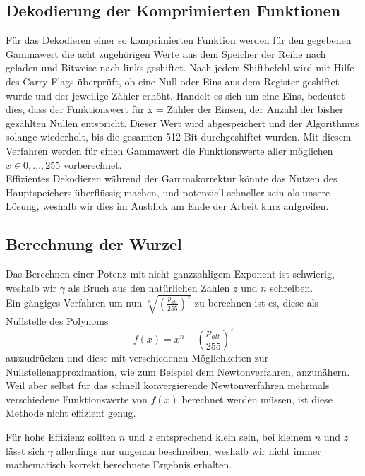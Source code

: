 \documentclass[course=erap]{aspdoc}
\begin{document}
	\subsection{Dekodierung der Komprimierten Funktionen}
	Für das Dekodieren einer so komprimierten Funktion werden für den gegebenen Gammawert die acht zugehörigen Werte aus dem Speicher der Reihe nach geladen und Bitweise nach links geshiftet. Nach jedem Shiftbefehl wird mit Hilfe des Carry-Flags überprüft, ob eine Null oder Eins aus dem Register geshiftet wurde und der jeweilige Zähler erhöht. Handelt es sich um eine Eins, bedeutet dies, dass der Funktionswert für x = Zähler der Einsen, der Anzahl der bisher gezählten Nullen entspricht. Dieser Wert wird abgespeichert und der Algorithmus solange wiederholt, bis die gesamten 512 Bit durchgeshiftet wurden. Mit diesem Verfahren werden für einen Gammawert die Funktionswerte aller möglichen $x\in{0,...,255}$ vorberechnet.\\
	Effizientes Dekodieren während der Gammakorrektur könnte das Nutzen des Hauptspeichers überflüssig machen, und potenziell schneller sein als unsere Lösung, weshalb wir dies im Ausblick am Ende der Arbeit kurz aufgreifen.

	\subsection{Berechnung der Wurzel}
	Das Berechnen einer Potenz mit nicht ganzzahligem Exponent ist schwierig, weshalb wir $\gamma$ als Bruch aus den natürlichen Zahlen $z$ und $n$ schreiben.\\
	
	\noindent Ein gängiges Verfahren um nun $\sqrt[n]{\left(\frac{p_{alt}}{255}\right)^{z}}$ zu berechnen ist es, diese als Nullstelle des Polynoms 
	\begin{equation}
	\label{(4)}
	f(x) = {x}^{n} - \left(\frac{p_{alt}}{255}\right)^{z}
	\end{equation}
	 auszudrücken und diese mit verschiedenen Möglichkeiten zur Nullstellenapproximation, wie zum Beispiel dem Newtonverfahren, anzunähern. Weil aber selbst für das schnell konvergierende Newtonverfahren mehrmals verschiedene Funktionswerte von $f(x)$ berechnet werden müssen, ist diese Methode nicht effizient genug.
	
	Für hohe Effizienz sollten $n$ und $z$ entsprechend klein sein, bei kleinem $n$ und $z$ lässt sich $\gamma$ allerdings nur ungenau beschreiben, weshalb wir nicht immer mathematisch korrekt berechnete Ergebnis erhalten.
	
\end{document}
